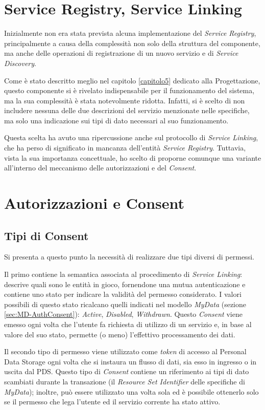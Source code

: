\section{Service Registry, Service Linking}
Inizialmente non era stata prevista alcuna implementazione del \textit{Service Registry}, principalmente a causa della complessit\`a non solo della struttura del componente, ma anche delle operazioni di registrazione di un nuovo servizio e di \textit{Service Discovery}.

Come \`e stato descritto meglio nel capitolo \ref{capitolo5} dedicato alla Progettazione, questo componente si \`e rivelato indispensabile per il funzionamento del sistema, ma la sua complessit\`a \`e stata notevolmente ridotta. Infatti, si \`e scelto di non includere nessuna delle due descrizioni del servizio menzionate nelle specifiche, ma solo una indicazione sui tipi di dato necessari al suo funzionamento.

Questa scelta ha avuto una ripercussione anche sul protocollo di \textit{Service Linking}, che ha perso di significato in mancanza dell’entit\`a \textit{Service Registry}. Tuttavia, vista la sua importanza concettuale, ho scelto di proporne comunque una variante all’interno del meccanismo delle autorizzazioni e del \textit{Consent}.

\section{Autorizzazioni e Consent}
\subsection{Tipi di Consent}
\label{subsec:A-Consent}
Si presenta a questo punto la necessit\`a di realizzare due tipi diversi di permessi.

Il primo contiene la semantica associata al procedimento di \textit{Service Linking}: descrive quali sono le entit\`a in gioco, fornendone una mutua autenticazione e contiene uno stato per indicare la validit\`a del permesso considerato. I valori possibili di questo stato ricalcano quelli indicati nel modello \textit{MyData} (sezione \ref{sec:MD-AuthConsent}): \textit{Active}, \textit{Disabled}, \textit{Withdrawn}. Questo \textit{Consent} viene emesso ogni volta che l’utente fa richiesta di utilizzo di un servizio e, in base al valore del suo stato, permette (o meno) l’effettivo processamento dei dati.

Il secondo tipo di permesso viene utilizzato come \textit{token} di accesso al Personal Data Storage ogni volta che si instaura un flusso di dati, sia esso in ingresso o in uscita dal PDS. Questo tipo di \textit{Consent} contiene un riferimento ai tipi di dato scambiati durante la transazione (il \textit{Resource Set Identifier} delle specifiche di \textit{MyData}); inoltre, pu\`o essere utilizzato una volta sola ed \`e possibile ottenerlo solo se il permesso che lega l’utente ed il servizio corrente ha stato attivo.

